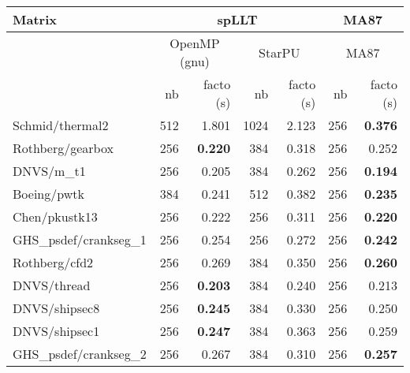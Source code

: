 \begin{tabular}{l|rr|rr|rr}
  \hline
  Matrix                          & \multicolumn{4}{c}{spLLT}        & \multicolumn{2}{c}{MA87}                                         \\
  \hline
                                  & \multicolumn{2}{c}{OpenMP (gnu)} & \multicolumn{2}{c}{StarPU} & \multicolumn{2}{c}{MA87}            \\ 
  \cline{2-7}
                                  & nb                               & facto (s)                  & nb   & facto (s) & nb  & facto (s)  \\
  \hline
  Schmid/thermal2                 & 512                              & 1.801                      & 1024 & 2.123     & 256 & \bf 0.376  \\
  Rothberg/gearbox                & 256                              & \bf 0.220                  & 384  & 0.318     & 256 & 0.252      \\
  DNVS/m\_t1                      & 256                              & 0.205                      & 384  & 0.262     & 256 & \bf 0.194  \\
  Boeing/pwtk                     & 384                              & 0.241                      & 512  & 0.382     & 256 & \bf 0.235  \\
  Chen/pkustk13                   & 256                              & 0.222                      & 256  & 0.311     & 256 & \bf 0.220  \\
  GHS\_psdef/crankseg\_1          & 256                              & 0.254                      & 256  & 0.272     & 256 & \bf 0.242  \\
  Rothberg/cfd2                   & 256                              & 0.269                      & 384  & 0.350     & 256 & \bf 0.260  \\
  DNVS/thread                     & 256                              & \bf 0.203                  & 384  & 0.240     & 256 & 0.213      \\
  DNVS/shipsec8                   & 256                              & \bf 0.245                  & 384  & 0.330     & 256 & 0.250      \\
  DNVS/shipsec1                   & 256                              & \bf 0.247                  & 384  & 0.363     & 256 & 0.259      \\
  GHS\_psdef/crankseg\_2          & 256                              & 0.267                      & 384  & 0.310     & 256 & \bf 0.257  \\

\end{tabular}

